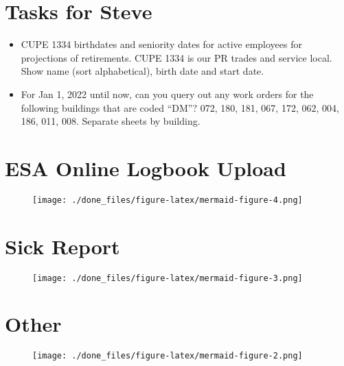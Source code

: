 \documentclass[
  letterpaper,
  DIV=11,
  numbers=noendperiod,
  oneside]{scrreprt}
\providecommand{\tightlist}{%
  \setlength{\itemsep}{0pt}\setlength{\parskip}{0pt}}\usepackage{longtable,booktabs,array}
\begin{document}
\hypertarget{tasks-for-steve}{%
\section{Tasks for Steve}\label{tasks-for-steve}}

\begin{itemize}
\tightlist
\item
  CUPE 1334 birthdates and seniority dates for active employees for
  projections of retirements. CUPE 1334 is our PR trades and service
  local. Show name (sort alphabetical), birth date and start date.
\item
  For Jan 1, 2022 until now, can you query out any work orders for the
  following buildings that are coded ``DM''? 072, 180, 181, 067, 172,
  062, 004, 186, 011, 008. Separate sheets by building.
\end{itemize}

\hypertarget{esa-online-logbook-upload}{%
\section{ESA Online Logbook Upload}\label{esa-online-logbook-upload}}

\begin{figure}[H]

{\centering \texttt{[image: ./done\_files/figure-latex/mermaid-figure-4.png]}

}

\end{figure}

\hypertarget{sick-report}{%
\section{Sick Report}\label{sick-report}}

\begin{figure}[H]

{\centering \texttt{[image: ./done\_files/figure-latex/mermaid-figure-3.png]}

}

\end{figure}

\hypertarget{other-1}{%
\section{Other}\label{other-1}}

\begin{figure}[H]

{\centering \texttt{[image: ./done\_files/figure-latex/mermaid-figure-2.png]}

}

\end{figure}
\end{document}
